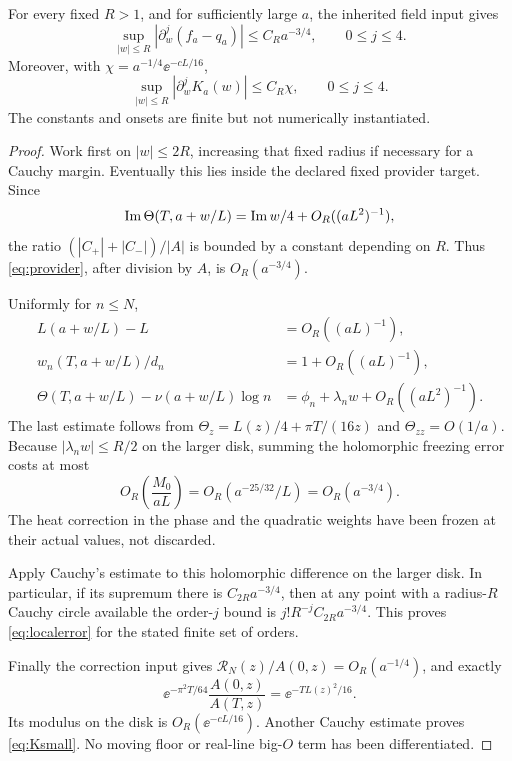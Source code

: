 \begin{theorem}\label{thm:local}
For every fixed \(R>1\), and for sufficiently large \(a\), the inherited
field input gives
\begin{equation}\label{eq:localerror}
 \sup_{|w|\le R}|\partial_w^j(f_a-q_a)|
       \le C_Ra^{-3/4},\qquad 0\le j\le4.
\end{equation}
Moreover, with \(\chi=a^{-1/4}\ee^{-cL/16}\),
\begin{equation}\label{eq:Ksmall}
 \sup_{|w|\le R}|\partial_w^jK_a(w)|\le C_R\chi,
                    \qquad 0\le j\le4.
\end{equation}
The constants and onsets are finite but not numerically instantiated.
\end{theorem}
\begin{proof}
Work first on \(|w|\le2R\), increasing that fixed radius if necessary
for a Cauchy margin. Eventually this lies inside the declared fixed
provider target. Since
\[
 \operatorname{Im}\Theta(T,a+w/L)=\operatorname{Im} w/4+O_R((aL^2)^{-1}),
\]
the ratio \((|C_+|+|C_-|)/|A|\) is bounded by a constant depending on
\(R\). Thus \eqref{eq:provider}, after division by \(A\), is
\(O_R(a^{-3/4})\).

Uniformly for \(n\le N\),
\begin{align*}
 L(a+w/L)-L&=O_R((aL)^{-1}),\\
 w_n(T,a+w/L)/d_n&=1+O_R((aL)^{-1}),\\
 \Theta(T,a+w/L)-\nu(a+w/L)\log n
    &=\phi_n+\lambda_nw+O_R((aL^2)^{-1}).
\end{align*}
The last estimate follows from
\(\Theta_z=L(z)/4+\pi T/(16z)\) and \(\Theta_{zz}=O(1/a)\).
Because \(|\lambda_n w|\le R/2\) on the larger disk, summing the
holomorphic freezing error costs at most
\[
 O_R\!\left(\frac{M_0}{aL}\right)
 =O_R(a^{-25/32}/L)=O_R(a^{-3/4}).
\]
The heat correction in the phase and the quadratic weights have been
frozen at their actual values, not discarded.

Apply Cauchy's estimate to this holomorphic difference on the larger
disk. In particular, if its supremum there is \(C_{2R}a^{-3/4}\),
then at any point with a radius-\(R\) Cauchy circle available the
order-\(j\) bound is \(j!R^{-j}C_{2R}a^{-3/4}\).
This proves \eqref{eq:localerror} for the stated finite set of orders.

Finally the correction input gives
\(\mathcal R_N(z)/A(0,z)=O_R(a^{-1/4})\), and exactly
\[
 \ee^{-\pi^2T/64}\frac{A(0,z)}{A(T,z)}
                 =\ee^{-T L(z)^2/16}.
\]
Its modulus on the disk is \(O_R(\ee^{-cL/16})\).
Another Cauchy estimate proves \eqref{eq:Ksmall}. No moving floor or
real-line big-\(O\) term has been differentiated.
\end{proof}

